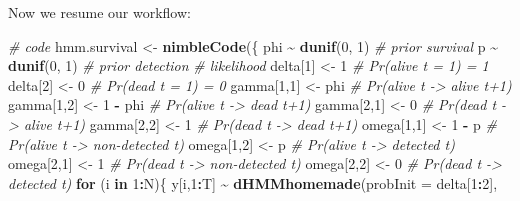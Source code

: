 \documentclass[
  12pt,
]{krantz}
\newenvironment{Shaded}{\begin{snugshade}}{\end{snugshade}}
\newcommand{\AttributeTok}[1]{\textcolor[rgb]{0.13,0.29,0.53}{#1}}
\newcommand{\CommentTok}[1]{\textcolor[rgb]{0.56,0.35,0.01}{\textit{#1}}}
\newcommand{\ControlFlowTok}[1]{\textcolor[rgb]{0.13,0.29,0.53}{\textbf{#1}}}
\newcommand{\DecValTok}[1]{\textcolor[rgb]{0.00,0.00,0.81}{#1}}
\newcommand{\FunctionTok}[1]{\textcolor[rgb]{0.13,0.29,0.53}{\textbf{#1}}}
\newcommand{\NormalTok}[1]{#1}
\newcommand{\OtherTok}[1]{\textcolor[rgb]{0.56,0.35,0.01}{#1}}
\newcommand{\SpecialCharTok}[1]{\textcolor[rgb]{0.81,0.36,0.00}{\textbf{#1}}}
\begin{document}
Now we resume our workflow:

\begin{Shaded}
\begin{Highlighting}[]
\CommentTok{\# code}
\NormalTok{hmm.survival }\OtherTok{\textless{}{-}} \FunctionTok{nimbleCode}\NormalTok{(\{}
\NormalTok{  phi }\SpecialCharTok{\textasciitilde{}} \FunctionTok{dunif}\NormalTok{(}\DecValTok{0}\NormalTok{, }\DecValTok{1}\NormalTok{) }\CommentTok{\# prior survival}
\NormalTok{  p }\SpecialCharTok{\textasciitilde{}} \FunctionTok{dunif}\NormalTok{(}\DecValTok{0}\NormalTok{, }\DecValTok{1}\NormalTok{) }\CommentTok{\# prior detection}
  \CommentTok{\# likelihood}
\NormalTok{  delta[}\DecValTok{1}\NormalTok{] }\OtherTok{\textless{}{-}} \DecValTok{1}          \CommentTok{\# Pr(alive t = 1) = 1}
\NormalTok{  delta[}\DecValTok{2}\NormalTok{] }\OtherTok{\textless{}{-}} \DecValTok{0}          \CommentTok{\# Pr(dead t = 1) = 0}
\NormalTok{  gamma[}\DecValTok{1}\NormalTok{,}\DecValTok{1}\NormalTok{] }\OtherTok{\textless{}{-}}\NormalTok{ phi      }\CommentTok{\# Pr(alive t {-}\textgreater{} alive t+1)}
\NormalTok{  gamma[}\DecValTok{1}\NormalTok{,}\DecValTok{2}\NormalTok{] }\OtherTok{\textless{}{-}} \DecValTok{1} \SpecialCharTok{{-}}\NormalTok{ phi  }\CommentTok{\# Pr(alive t {-}\textgreater{} dead t+1)}
\NormalTok{  gamma[}\DecValTok{2}\NormalTok{,}\DecValTok{1}\NormalTok{] }\OtherTok{\textless{}{-}} \DecValTok{0}        \CommentTok{\# Pr(dead t {-}\textgreater{} alive t+1)}
\NormalTok{  gamma[}\DecValTok{2}\NormalTok{,}\DecValTok{2}\NormalTok{] }\OtherTok{\textless{}{-}} \DecValTok{1}        \CommentTok{\# Pr(dead t {-}\textgreater{} dead t+1)}
\NormalTok{  omega[}\DecValTok{1}\NormalTok{,}\DecValTok{1}\NormalTok{] }\OtherTok{\textless{}{-}} \DecValTok{1} \SpecialCharTok{{-}}\NormalTok{ p    }\CommentTok{\# Pr(alive t {-}\textgreater{} non{-}detected t)}
\NormalTok{  omega[}\DecValTok{1}\NormalTok{,}\DecValTok{2}\NormalTok{] }\OtherTok{\textless{}{-}}\NormalTok{ p        }\CommentTok{\# Pr(alive t {-}\textgreater{} detected t)}
\NormalTok{  omega[}\DecValTok{2}\NormalTok{,}\DecValTok{1}\NormalTok{] }\OtherTok{\textless{}{-}} \DecValTok{1}        \CommentTok{\# Pr(dead t {-}\textgreater{} non{-}detected t)}
\NormalTok{  omega[}\DecValTok{2}\NormalTok{,}\DecValTok{2}\NormalTok{] }\OtherTok{\textless{}{-}} \DecValTok{0}        \CommentTok{\# Pr(dead t {-}\textgreater{} detected t)}
  \ControlFlowTok{for}\NormalTok{ (i }\ControlFlowTok{in} \DecValTok{1}\SpecialCharTok{:}\NormalTok{N)\{}
\NormalTok{    y[i,}\DecValTok{1}\SpecialCharTok{:}\NormalTok{T] }\SpecialCharTok{\textasciitilde{}} \FunctionTok{dHMMhomemade}\NormalTok{(}\AttributeTok{probInit =}\NormalTok{ delta[}\DecValTok{1}\SpecialCharTok{:}\DecValTok{2}\NormalTok{], }

\end{Highlighting}
\end{Shaded}
\end{document}
